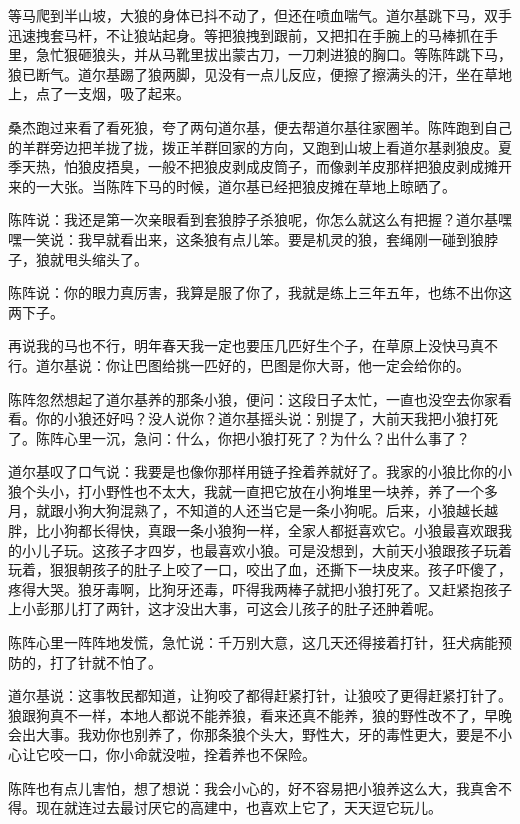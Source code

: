 \par 等马爬到半山坡，大狼的身体已抖不动了，但还在喷血喘气。道尔基跳下马，双手迅速拽套马杆，不让狼站起身。等把狼拽到跟前，又把扣在手腕上的马棒抓在手里，急忙狠砸狼头，并从马靴里拔出蒙古刀，一刀刺进狼的胸口。等陈阵跳下马，狼已断气。道尔基踢了狼两脚，见没有一点儿反应，便擦了擦满头的汗，坐在草地上，点了一支烟，吸了起来。
\par 桑杰跑过来看了看死狼，夸了两句道尔基，便去帮道尔基往家圈羊。陈阵跑到自己的羊群旁边把羊拢了拢，拨正羊群回家的方向，又跑到山坡上看道尔基剥狼皮。夏季天热，怕狼皮捂臭，一般不把狼皮剥成皮筒子，而像剥羊皮那样把狼皮剥成摊开来的一大张。当陈阵下马的时候，道尔基已经把狼皮摊在草地上晾晒了。
\par 陈阵说：我还是第一次亲眼看到套狼脖子杀狼呢，你怎么就这么有把握？道尔基嘿嘿一笑说：我早就看出来，这条狼有点儿笨。要是机灵的狼，套绳刚一碰到狼脖子，狼就甩头缩头了。
\par 陈阵说：你的眼力真厉害，我算是服了你了，我就是练上三年五年，也练不出你这两下子。
\par 再说我的马也不行，明年春天我一定也要压几匹好生个子，在草原上没快马真不行。道尔基说：你让巴图给挑一匹好的，巴图是你大哥，他一定会给你的。
\par 陈阵忽然想起了道尔基养的那条小狼，便问：这段日子太忙，一直也没空去你家看看。你的小狼还好吗？没人说你？道尔基摇头说：别提了，大前天我把小狼打死了。陈阵心里一沉，急问：什么，你把小狼打死了？为什么？出什么事了？
\par 道尔基叹了口气说：我要是也像你那样用链子拴着养就好了。我家的小狼比你的小狼个头小，打小野性也不太大，我就一直把它放在小狗堆里一块养，养了一个多月，就跟小狗大狗混熟了，不知道的人还当它是一条小狗呢。后来，小狼越长越胖，比小狗都长得快，真跟一条小狼狗一样，全家人都挺喜欢它。小狼最喜欢跟我的小儿子玩。这孩子才四岁，也最喜欢小狼。可是没想到，大前天小狼跟孩子玩着玩着，狠狠朝孩子的肚子上咬了一口，咬出了血，还撕下一块皮来。孩子吓傻了，疼得大哭。狼牙毒啊，比狗牙还毒，吓得我两棒子就把小狼打死了。又赶紧抱孩子上小彭那儿打了两针，这才没出大事，可这会儿孩子的肚子还肿着呢。
\par 陈阵心里一阵阵地发慌，急忙说：千万别大意，这几天还得接着打针，狂犬病能预防的，打了针就不怕了。
\par 道尔基说：这事牧民都知道，让狗咬了都得赶紧打针，让狼咬了更得赶紧打针了。狼跟狗真不一样，本地人都说不能养狼，看来还真不能养，狼的野性改不了，早晚会出大事。我劝你也别养了，你那条狼个头大，野性大，牙的毒性更大，要是不小心让它咬一口，你小命就没啦，拴着养也不保险。
\par 陈阵也有点儿害怕，想了想说：我会小心的，好不容易把小狼养这么大，我真舍不得。现在就连过去最讨厌它的高建中，也喜欢上它了，天天逗它玩儿。
